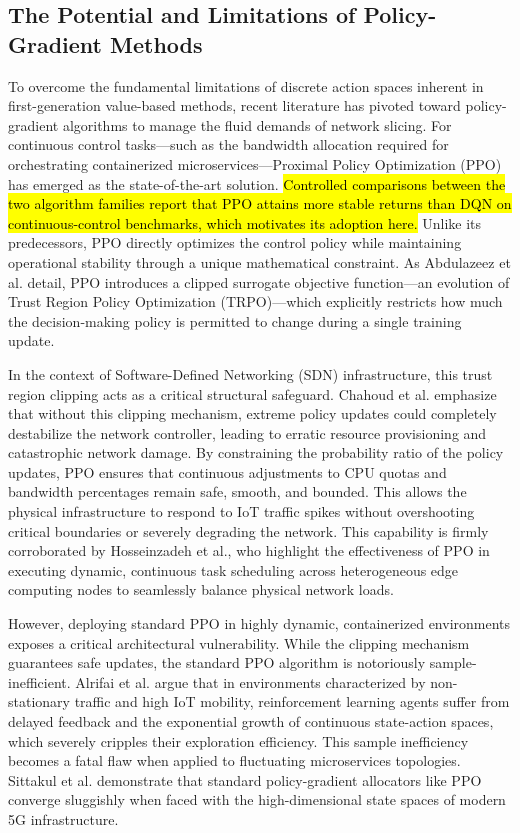 \documentclass[conference]{IEEEtran}
\newcommand{\rev}[1]{\hl{#1}}
\begin{document}
\subsection{The Potential and Limitations of Policy-Gradient Methods}\label{sec:rw-pg}

To overcome the fundamental limitations of discrete action spaces inherent in first-generation value-based methods, recent literature has pivoted toward policy-gradient algorithms to manage the fluid demands of network slicing. For continuous control tasks---such as the bandwidth allocation required for orchestrating containerized microservices---Proximal Policy Optimization (PPO) has emerged as the state-of-the-art solution. \rev{Controlled comparisons between the two algorithm families report that PPO attains more stable returns than DQN on continuous-control benchmarks}\cite{b37}\rev{, which motivates its adoption here.} Unlike its predecessors, PPO directly optimizes the control policy while maintaining operational stability through a unique mathematical constraint. As Abdulazeez et al. detail, PPO introduces a clipped surrogate objective function---an evolution of Trust Region Policy Optimization (TRPO)---which explicitly restricts how much the decision-making policy is permitted to change during a single training update\cite{b36}.

In the context of Software-Defined Networking (SDN) infrastructure, this trust region clipping acts as a critical structural safeguard. Chahoud et al. emphasize that without this clipping mechanism, extreme policy updates could completely destabilize the network controller, leading to erratic resource provisioning and catastrophic network damage\cite{b18}. By constraining the probability ratio of the policy updates, PPO ensures that continuous adjustments to CPU quotas and bandwidth percentages remain safe, smooth, and bounded. This allows the physical infrastructure to respond to IoT traffic spikes without overshooting critical boundaries or severely degrading the network\cite{b18}. This capability is firmly corroborated by Hosseinzadeh et al., who highlight the effectiveness of PPO in executing dynamic, continuous task scheduling across heterogeneous edge computing nodes to seamlessly balance physical network loads\cite{b15}.

However, deploying standard PPO in highly dynamic, containerized environments exposes a critical architectural vulnerability. While the clipping mechanism guarantees safe updates, the standard PPO algorithm is notoriously sample-inefficient\cite{b18}. Alrifai et al. argue that in environments characterized by non-stationary traffic and high IoT mobility, reinforcement learning agents suffer from delayed feedback and the exponential growth of continuous state-action spaces, which severely cripples their exploration efficiency\cite{b14}. This sample inefficiency becomes a fatal flaw when applied to fluctuating microservices topologies. Sittakul et al. demonstrate that standard policy-gradient allocators like PPO converge sluggishly when faced with the high-dimensional state spaces of modern 5G infrastructure\cite{b16}.
\end{document}
